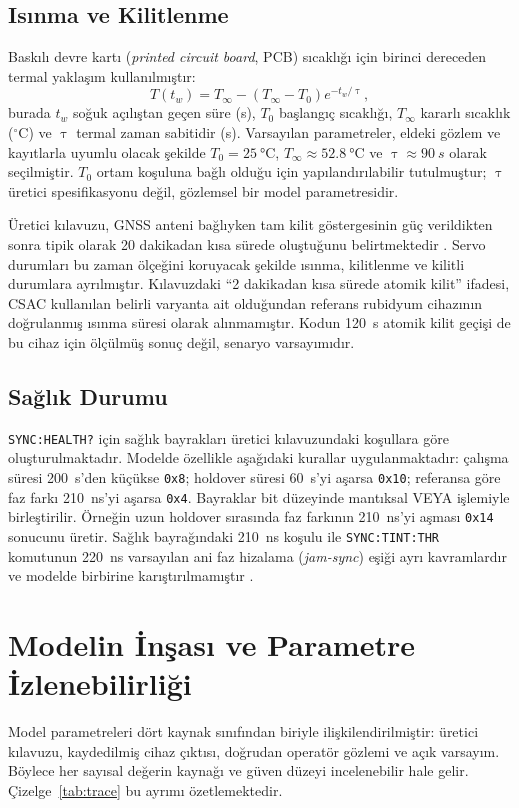 \documentclass[9pt,twocolumn,a4paper]{extarticle}
\begin{document}
\subsection{Isınma ve Kilitlenme}
Baskılı devre kartı (\emph{printed circuit board}, PCB) sıcaklığı için birinci dereceden termal yaklaşım kullanılmıştır:
\begin{equation}
 T(t_w)=T_{\infty}-\left(T_{\infty}-T_0\right)e^{-t_w/\uptau},
 \label{eq:thermal}
\end{equation}
burada $t_w$ soğuk açılıştan geçen süre (s), $T_0$ başlangıç sıcaklığı, $T_{\infty}$ kararlı sıcaklık ($^{\circ}$C) ve $\uptau$ termal zaman sabitidir (s). Varsayılan parametreler, eldeki gözlem ve kayıtlarla uyumlu olacak şekilde $T_0=\SI{25}{\celsius}$, $T_{\infty}\approx\SI{52.8}{\celsius}$ ve $\uptau\approx\SI{90}{s}$ olarak seçilmiştir. $T_0$ ortam koşuluna bağlı olduğu için yapılandırılabilir tutulmuştur; $\uptau$ üretici spesifikasyonu değil, gözlemsel bir model parametresidir.

Üretici kılavuzu, GNSS anteni bağlıyken tam kilit göstergesinin güç verildikten sonra tipik olarak 20 dakikadan kısa sürede oluştuğunu belirtmektedir \cite{jlt2015}. Servo durumları bu zaman ölçeğini koruyacak şekilde ısınma, kilitlenme ve kilitli durumlara ayrılmıştır. Kılavuzdaki ``2 dakikadan kısa sürede atomik kilit'' ifadesi, CSAC kullanılan belirli varyanta ait olduğundan referans rubidyum cihazının doğrulanmış ısınma süresi olarak alınmamıştır. Kodun 120~s atomik kilit geçişi de bu cihaz için ölçülmüş sonuç değil, senaryo varsayımıdır.

\subsection{Sağlık Durumu}
\texttt{SYNC:HEALTH?} için sağlık bayrakları üretici kılavuzundaki koşullara göre oluşturulmaktadır. Modelde özellikle aşağıdaki kurallar uygulanmaktadır: çalışma süresi 200~s'den küçükse \texttt{0x8}; holdover süresi 60~s'yi aşarsa \texttt{0x10}; referansa göre faz farkı 210~ns'yi aşarsa \texttt{0x4}. Bayraklar bit düzeyinde mantıksal VEYA işlemiyle birleştirilir. Örneğin uzun holdover sırasında faz farkının 210~ns'yi aşması \texttt{0x14} sonucunu üretir. Sağlık bayrağındaki 210~ns koşulu ile \texttt{SYNC:TINT:THR} komutunun 220~ns varsayılan ani faz hizalama (\emph{jam-sync}) eşiği ayrı kavramlardır ve modelde birbirine karıştırılmamıştır \cite{jlt2015}.

\section{Modelin İnşası ve Parametre İzlenebilirliği}
Model parametreleri dört kaynak sınıfından biriyle ilişkilendirilmiştir: üretici kılavuzu, kaydedilmiş cihaz çıktısı, doğrudan operatör gözlemi ve açık varsayım. Böylece her sayısal değerin kaynağı ve güven düzeyi incelenebilir hale gelir. Çizelge~\ref{tab:trace} bu ayrımı özetlemektedir.
\end{document}
